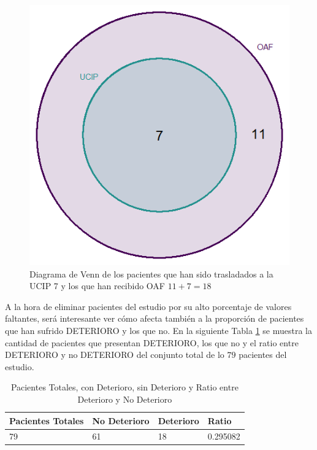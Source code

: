 \begin{figure}[H]
    \centering
    \includegraphics[scale = 1.50]{./img/venn-diagram-OAF-UCIP.png}
    \caption{Diagrama de Venn de los pacientes que han sido trasladados a la UCIP 7 y los que han recibido OAF $11 + 7 = 18$}
    \label{fig:venn-OAF-UCIP}
\end{figure}


A la hora de eliminar pacientes del estudio por su alto porcentaje de valores faltantes, será interesante ver cómo afecta también a la proporción de pacientes que han sufrido DETERIORO y los que no. En la siguiente Tabla \ref{tabla:ratio-deterioro} se muestra la cantidad de pacientes que presentan DETERIORO, los que no y el ratio entre DETERIORO y no DETERIORO del conjunto total de lo $79$ pacientes del estudio.

\begin{table}[H]
    \centering
    \begin{tabular}{|m{2cm}|m{2.25cm}|m{2cm}|m{2cm}|}
    \hline
        Pacientes Totales & No Deterioro & Deterioro & Ratio \\ \hline
        79 & 61 & 18 & 0.295082 \\ \hline
    \end{tabular}
    \caption{Pacientes Totales, con Deterioro, sin Deterioro y Ratio entre Deterioro y No Deterioro}
        \label{tabla:ratio-deterioro}
\end{table}

